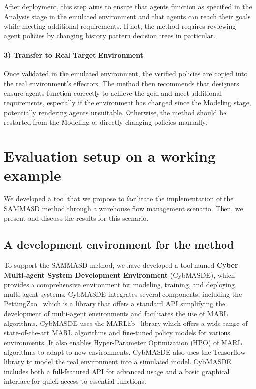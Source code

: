 \documentclass[sigconf,anonymous]{aamas}
\begin{document}
After deployment, this step aims to ensure that agents function as specified in the Analysis stage in the emulated environment and that agents can reach their goals while meeting additional requirements. If not, the method requires reviewing agent policies by changing history pattern decision trees in particular.

\paragraph{\textbf{3) Transfer to Real Target Environment}}

Once validated in the emulated environment, the verified policies are copied into the real environment's effectors. The method then recommends that designers ensure agents function correctly to achieve the goal and meet additional requirements, especially if the environment has changed since the Modeling stage, potentially rendering agents unsuitable. Otherwise, the method should be restarted from the Modeling or directly changing policies manually.

\section{Evaluation setup on a working example}
\label{sec:evaluation}

We developed a tool that we propose to facilitate the implementation of the SAMMASD method through a warehouse flow management scenario. Then, we present and discuss the results for this scenario.

\subsection{A development environment for the method}

To support the SAMMASD method, we have developed a tool named \textbf{Cyber Multi-agent System Development Environment} (CybMASDE), which provides a comprehensive environment for modeling, training, and deploying multi-agent systems. CybMASDE integrates several components, including the PettingZoo~\cite{Terry2021} which is a library that offers a standard API simplifying the development of multi-agent environments and facilitates the use of MARL algorithms. CybMASDE uses the MARLlib~\cite{hu2022marllib} library which offers a wide range of state-of-the-art MARL algorithms and fine-tuned policy models for various environments. It also enables Hyper-Parameter Optimization (HPO) of MARL algorithms to adapt to new environments. CybMASDE also uses the Tensorflow library to model the real environment into a simulated model. CybMASDE includes both a full-featured API for advanced usage and a basic graphical interface for quick access to essential functions.
\end{document}
